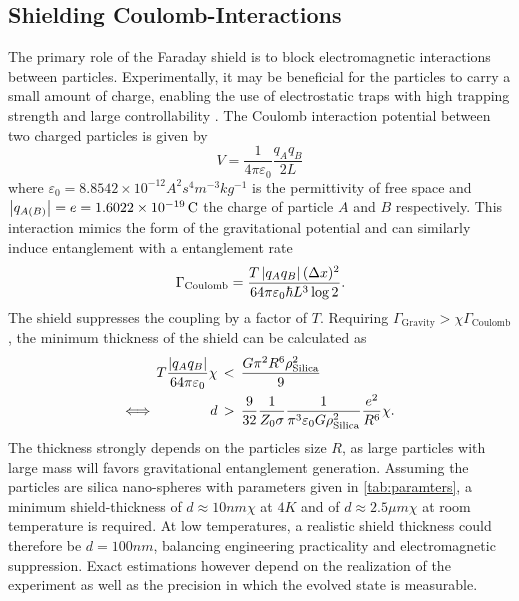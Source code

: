 \subsection{Shielding Coulomb-Interactions}
The primary role of the Faraday shield is to block electromagnetic interactions between particles.
Experimentally, it may be beneficial for the particles to carry a small amount of charge, enabling the use of electrostatic traps with high trapping strength and large controllability \cite{GonzalezBallestero_2021}. 
The Coulomb interaction potential between two charged particles is given by
\begin{equation}
  V = \frac{1}{4\pi\varepsilon_0} \frac{q_A q_B}{2L}
\end{equation}
where $\varepsilon_0 = 8.8542\times 10^{-12}\si{A^2 s^4 m^{-3} kg^{-1}}$ is the permittivity of free space and $\left\lvert q_{A(B)}\right\rvert = e = 1.6022\times 10^{-19}\, \mathrm{C}$ the charge of particle $A$ and $B$ respectively.
This interaction mimics the form of the gravitational potential and can similarly induce entanglement with a entanglement rate
\begin{equation}\label{eq:5:entanglement-rate-coulomb}
  \Gamma_\mathrm{Coulomb} = \frac{T \left\lvert q_A q_B\right\rvert (\Delta x)^2}{64 \pi \varepsilon_0 \hbar L^3 \log 2} .
\end{equation}
The shield suppresses the coupling by a factor of $T$.
Requiring $\Gamma_\mathrm{Gravity} > \chi \Gamma_\mathrm{Coulomb}$, the minimum thickness of the shield can be calculated as
\begin{align}\label{eq:5:coulomb-gravity-condition}
  T \frac{\left\lvert q_A q_B\right\rvert}{64 \pi \varepsilon_0} \chi \, &< \, \frac{G \pi^2 R^6 \rho_\mathrm{Silica}^2}{9} \\
  \Longleftrightarrow \quad\quad\quad\quad d \, &> \, \frac{9}{32}\frac{1}{Z_0 \sigma} \frac{1}{\pi^3 \varepsilon_0 G \rho_\mathrm{Silica}^2} \frac{e^2}{R^6} \chi .
\end{align}
The thickness strongly depends on the particles size $R$, as large particles with large mass will favors gravitational entanglement generation.
Assuming the particles are silica nano-spheres with parameters given in \cref{tab:paramters}, a minimum shield-thickness of $d \approx 10\si{nm}\chi$ at $4\si{K}$ and of $d \approx 2.5\si{\mu m}\chi$ at room temperature is required.
At low temperatures, a realistic shield thickness could therefore be $d=100\si{nm}$, balancing engineering practicality and electromagnetic suppression.
Exact estimations however depend on the realization of the experiment as well as the precision in which the evolved state is measurable.

